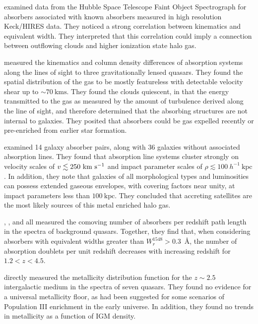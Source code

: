 \documentclass[linenumbers,twocolumn]{aastex61}
\begin{document}
\cite{Churchill1999} examined data from the Hubble Space Telescope Faint Object Spectrograph for {\CIV} absorbers associated with known {\MgII} absorbers measured in high resolution Keck/HIRES data. They noticed a strong correlation between {\MgII} kinematics and {\CIV} equivalent width. They interpreted that this correlation could imply a connection between outflowing {\MgII} clouds and higher ionization state halo gas.

\cite{Rauch2001} measured the kinematics and column density differences of {\CIV} absorption systems along the lines of sight to three gravitationally lensed quasars. They found the spatial distribution of the gas to be mostly featureless with detectable velocity shear up to $\sim70~\mathrm{kms}$. They found the clouds quiescent, in that the energy transmitted to the gas as measured by the amount of turbulence derived along the line of sight, and therefore determined that the absorbing structures are not internal to galaxies. They posited that {\CIV} absorbers could be gas expelled recently or pre-enriched from earlier star formation.

\cite{Chen2001} examined 14 galaxy absorber pairs, along with 36 galaxies without associated {\CIV} absorption lines. They found that {\CIV} absorption line systems cluster strongly on velocity scales of $v \lesssim 250~\mathrm{\hbox{km~s$^{-1}$}}$ and impact parameter scales of $\rho \lesssim 100~h^{-1}~\mathrm{kpc}$. In addition, they note that galaxies of all morphological types and luminosities can possess extended gaseous envelopes, with covering factors near unity, at impact parameters less than $100~\mathrm{kpc}$. They concluded that accreting satellites are the most likely sources of this metal enriched halo gas.

\cite{Steidel1990}, \cite{Sargent1998}, and \cite{Misawa2002} all measured the comoving number of {\CIV} absorbers per redshift path length in the spectra of background quasars. Together, they find that, when considering {\CIV} absorbers with equivalent widths greater than $W_r^{1548} > 0.3$~\AA, the number of absorption doublets per unit redshift decreases with increasing redshift for $1.2 < z < 4.5$.

\cite{Simcoe2004} directly measured the metallicity distribution function for the $z \sim 2.5$ intergalactic medium in the spectra of seven quasars. They found no evidence for a universal metallicity floor, as had been suggested for some scenarios of Population III enrichment in the early universe. In addition, they found no trends in metallicity as a function of IGM density.
\end{document}
